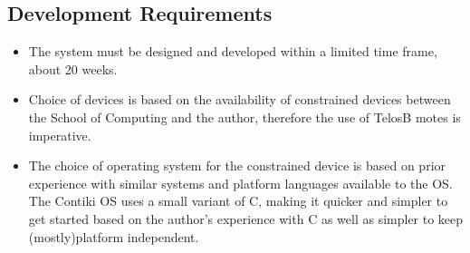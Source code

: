 
\subsection{Development Requirements} %
\label{sub:development_requirements}
\begin{itemize}
	\item The system must be designed and developed within a limited time frame, about 20 weeks.
	\item Choice of devices is based on the availability of constrained devices between the School of Computing and the author, therefore the use of TelosB motes is imperative.
	\item The choice of operating system for the constrained device is based on prior experience with similar systems and platform languages available to the OS. The Contiki OS uses a small variant of C, making it quicker and simpler to get started based on the author's experience with C as well as simpler to keep (mostly)platform independent.
\end{itemize}




\begin{comment}

\end{comment}










